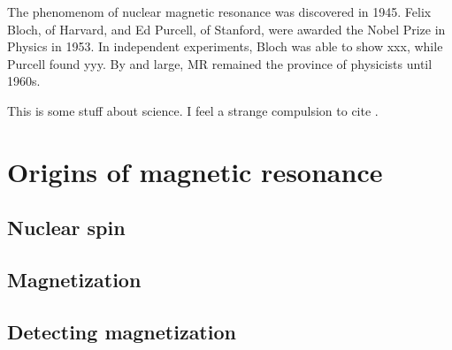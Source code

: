 The phenomenom of nuclear magnetic resonance was discovered in 1945. Felix Bloch, of Harvard, and Ed Purcell, of Stanford, were awarded the Nobel Prize in Physics in 1953. In independent experiments, Bloch was able to show xxx, while Purcell found yyy. By and large, MR remained the province of physicists until 1960s.    

This is some stuff about science. I feel a strange compulsion to cite
\cite{williams12}.

\section{Origins of magnetic resonance}

\subsection{Nuclear spin}
\subsection{Magnetization}
\subsection{Detecting magnetization}
\

%

